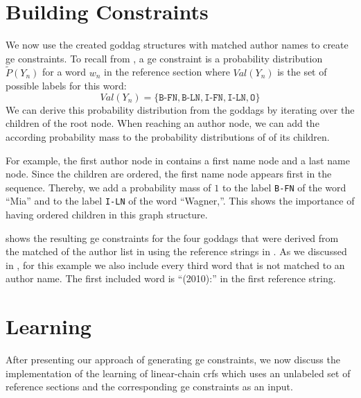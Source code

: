 \section{Building  Constraints}\label{sec:i-building-ge-constraints}

We now use the created \gls{goddag} structures with matched author names to create \gls{ge} constraints.
To recall from , a \gls{ge} constraint is a \gls{probability distribution} $\tilde{P}(Y_n)$ for a word $w_n$ in the reference section where $\textit{Val}(Y_n)$ is the set of possible labels for this word:
\begin{equation*}
  \mathit{Val}(Y_n)=\{\texttt{B-FN},\texttt{B-LN},\texttt{I-FN},\texttt{I-LN},\texttt{O}\}
\end{equation*}
We can derive this \gls{probability distribution} from the \glspl{goddag} by iterating over the children of the root node.
When reaching an author node, we can add the according probability mass to the probability distributions of of its children.

For example, the first author node in  contains a first name node and a last name node.
Since the children are ordered, the first name node appears first in the sequence.
Thereby, we add a probability mass of $1$ to the label \texttt{B-FN} of the word ``Mia'' and to the label \texttt{I-LN} of the word ``Wagner,''.
This shows the importance of having ordered children in this graph structure.

 shows the resulting \gls{ge} constraints for the four \glspl{goddag} that were derived from the matched of the author list in  using the reference strings in .
As we discussed in , for this example we also include every third word that is not matched to an author name.
The first included word is ``(2010):'' in the first reference string.

\section{Learning }\label{sec:i-learning-crfs}

After presenting our approach of generating \gls{ge} constraints, we now discuss the implementation of the learning of \glspl{linear-chain crf} which uses an unlabeled set of reference sections and the corresponding \gls{ge} constraints as an input.

